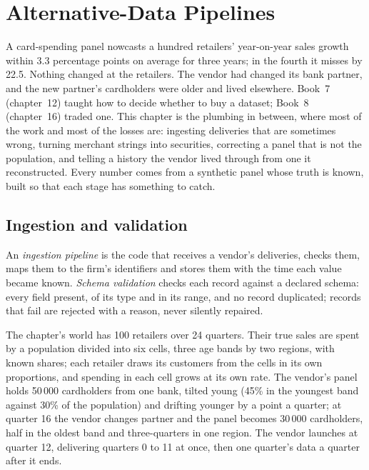 \chapter{Alternative-Data Pipelines}\label{ch:ml:alternative-data-pipelines}

A card-spending panel nowcasts a hundred retailers' year-on-year sales growth within 3.3 percentage points on average for
three years; in the fourth it misses by 22.5. Nothing changed at the retailers. The vendor had changed its bank partner,
and the new partner's cardholders were older and lived elsewhere. Book~7 (chapter~12) taught how to decide whether to buy
a dataset; Book~8 (chapter~16) traded one. This chapter is the plumbing in between, where most of the work and most of the
losses are: ingesting deliveries that are sometimes wrong, turning merchant strings into securities, correcting a panel
that is not the population, and telling a history the vendor lived through from one it reconstructed. Every number comes
from a synthetic panel whose truth is known, built so that each stage has something to catch.

\section{Ingestion and validation}

\begin{definition}\label{def:ml:alternative-data-pipelines:ingest}
An \emph{ingestion pipeline} is the code that receives a vendor's deliveries, checks them, maps
them to the firm's identifiers and stores them with the time each value became known. \emph{Schema
validation} checks each record against a declared schema: every field present, of its type and in
its range, and no record duplicated; records that fail are rejected with a reason, never silently repaired.
\end{definition}

The chapter's world has 100 retailers over 24 quarters. Their true sales are spent by a population divided into six cells,
three age bands by two regions, with known shares; each retailer draws its customers from the cells in its own proportions,
and spending in each cell grows at its own rate. The vendor's panel holds 50\,000 cardholders from one bank, tilted young
(45\% in the youngest band against 30\% of the population) and drifting younger by a point a quarter; at quarter 16 the
vendor changes partner and the panel becomes 30\,000 cardholders, half in the oldest band and three-quarters in one region.
The vendor launches at quarter 12, delivering quarters 0 to 11 at once, then one quarter's data a quarter after it ends.

